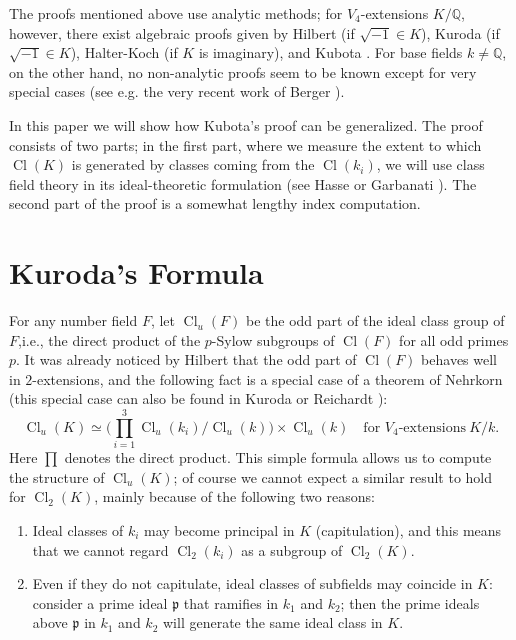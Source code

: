 \documentclass{amsart}
\newcommand{\Q}{\mathbb Q}
\newcommand{\fp}{{\mathfrak p}}
\newcommand{\Cl}{\operatorname{Cl}}
\begin{document}
The proofs mentioned above use analytic methods; for 
$V_4$-extensions $K/\Q$, however, there exist algebraic proofs 
given by Hilbert \cite{Hil} (if $\sqrt{-1} \in K$), Kuroda 
\cite{Kur1} (if $\sqrt{-1} \in K$), Halter-Koch \cite{HK} 
(if $K$ is imaginary), and Kubota \cite{Kub1,Kub2}. For base 
fields $k \ne \Q$, on the other hand, no non-analytic proofs 
seem to be known except for very special cases (see e.g. the 
very recent work of Berger \cite{Be}).

In this paper we will show how Kubota's proof can be generalized.
The proof consists of two parts; in the first part, where we
measure the extent to which $\Cl(K)$ is generated by classes
coming from the $\Cl(k_i)$, we will use class field theory in its
ideal-theoretic formulation (see Hasse \cite{HasB} or Garbanati
\cite{Gar}). The second part of the proof is a somewhat lengthy
index computation.

\section{Kuroda's Formula}
For any number field $F$, let $\Cl_u(F)$ be the odd part of the
ideal class group of $F$,i.e., the direct product of the $p$-Sylow
subgroups of $\Cl(F)$ for all odd primes $p$. It was already
noticed by Hilbert that the odd part of $\Cl(F)$ behaves well in
$2$-extensions, and the following fact is a special case of a theorem
of Nehrkorn \cite{Neh} (this special case can also be found in
Kuroda \cite{Kur2} or Reichardt \cite{Rei}):
\begin{equation}
\Cl_u(K) \simeq \Big(\prod_{i=1}^3 \Cl_u(k_i)/\Cl_u(k)\Big)
         \times \Cl_u(k) \quad \text{for $V_4$-extensions}\ K/k.
\end{equation}
Here $\prod$ denotes the direct product. This simple formula allows
us to compute the structure of $\Cl_u(K)$; of course we cannot
expect a similar result to hold for $\Cl_2(K)$, mainly because of
the following two reasons:
\begin{enumerate}
\item Ideal classes of $k_i$ may become principal in $K$
      (capitulation), and this means that we cannot regard
      $\Cl_2(k_i)$ as a subgroup of $\Cl_2(K)$.
\item Even if they do not capitulate, ideal classes of subfields may
      coincide in $K$: consider a prime ideal $\fp$ that ramifies
      in $k_1$ and $k_2$; then the prime ideals above $\fp$ in $k_1$
      and $k_2$ will generate the same ideal class in $K$.
\end{enumerate}
\end{document}
